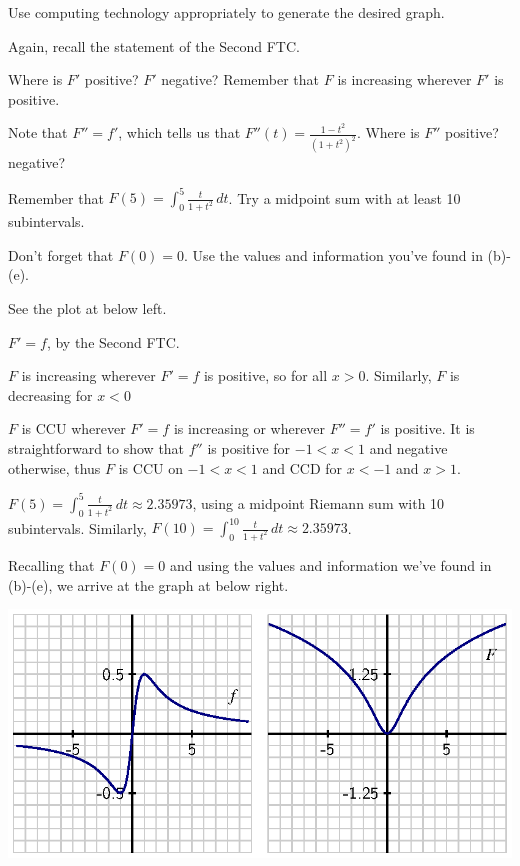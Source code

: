 \begin{bighint}
\ba
	\item Use computing technology appropriately to generate the desired graph.
	\item Again, recall the statement of the Second FTC.
	\item Where is $F'$ positive?  $F'$ negative?  Remember that $F$ is increasing wherever $F'$ is positive.
	\item Note that $F'' = f'$, which tells us that $F''(t) = \frac{1-t^2}{(1+t^2)^2}$.  Where is $F''$ positive? negative?
	\item Remember that $F(5) = \int_0^5 \frac{t}{1+t^2} \, dt$.  Try a midpoint sum with at least 10 subintervals.
	\item Don't forget that $F(0) = 0$.  Use the values and information you've found in (b)-(e).
\ea
\end{bighint}
\begin{activitySolution}
\ba
	\item See the plot at below left.
	\item $F' = f$, by the Second FTC.
	\item $F$ is increasing wherever $F'=f$ is positive, so for all $x > 0$.  Similarly, $F$ is decreasing for $x < 0$
	\item $F$ is CCU wherever $F' = f$ is increasing or wherever $F'' = f'$ is positive.  It is straightforward to show that $f''$ is positive for $-1 < x < 1$ and negative otherwise, thus $F$ is CCU on $-1 < x < 1$ and CCD for $x < -1$ and $x > 1$.
	\item $F(5) = \int_0^5 \frac{t}{1+t^2} \, dt \approx 2.35973$, using a midpoint Riemann sum with 10 subintervals.  Similarly, $F(10) = \int_0^{10} \frac{t}{1+t^2} \, dt \approx 2.35973$.
	\item Recalling that $F(0) = 0$ and using the values and information we've found in (b)-(e), we arrive at the graph at below right.
\ea
\begin{center}
\includegraphics{figures/5_2_Act2_soln.eps}
\end{center}
\end{activitySolution}
\aftera